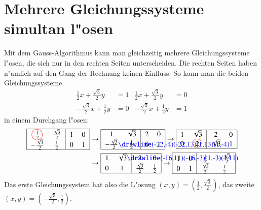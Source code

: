 \section{Mehrere Gleichungssysteme simultan l"osen\label{simultan}}
Mit dem Gauss-Algorithmus kann man gleichzeitig mehrere Gleichungssysteme
l"osen, die sich nur in den rechten Seiten unterscheiden. Die rechten
Seiten haben n"amlich auf den Gang der Rechnung keinen
Einfluss. So kann man die beiden Gleichungssysteme
\begin{align*}
\frac12x+\frac{\sqrt{3}}2y&=1
&
\frac12x+\frac{\sqrt{3}}2y&=0
\\
-\frac{\sqrt{3}}2x+\frac12y&=0
&
-\frac{\sqrt{3}}2x+\frac12y&=1
\end{align*}
in einem Durchgang l"osen:
\begin{align*}
\begin{tabular}{|>{$}c<{$}>{$}c<{$}|>{$}c<{$}>{$}c<{$}|}
\hline
\frac12%
\begin{picture}(0,0)
\color{red}\put(-3.5,3){\circle{15}}
\end{picture}%
&\frac{\sqrt{3}}2&1&0\\
-\frac{\sqrt{3}}2&\frac12&0&1\\
\hline
\end{tabular}
&\rightarrow
\begin{tabular}{|>{$}c<{$}>{$}c<{$}|>{$}c<{$}>{$}c<{$}|}
\hline
1&\sqrt{3}&2&0\\
-\frac{\sqrt{3}}2%
\begin{picture}(0,0)
\color{blue}\drawline(-22,-4)(-22,13)(1,13)(1,-4)
\end{picture}%
&\frac12&0&1\\
\hline
\end{tabular}
\rightarrow
\begin{tabular}{|>{$}c<{$}>{$}c<{$}|>{$}c<{$}>{$}c<{$}|}
\hline
1&\sqrt{3}&2&0\\
0&2%
\begin{picture}(0,0)
\color{red}\put(-3,4){\circle{12}}
\end{picture}%
&\sqrt{3}&1\\
\hline
\end{tabular}
\\
&\rightarrow
\begin{tabular}{|>{$}c<{$}>{$}c<{$}|>{$}c<{$}>{$}c<{$}|}
\hline
1&\sqrt{3}%
\begin{picture}(0,0)
\color{blue}\drawline(-16,11)(-16,-3)(1,-3)(1,11)
\end{picture}%
&2&0\\
0&1&\frac{\sqrt{3}}2&\frac12\\
\hline
\end{tabular}
\rightarrow
\begin{tabular}{|>{$}c<{$}>{$}c<{$}|>{$}c<{$}>{$}c<{$}|}
\hline
1&0&\frac12&-\frac{\sqrt{3}}2\\
0&1&\frac{\sqrt{3}}2&\frac12\\
\hline
\end{tabular}
\end{align*}
Das erste Gleichungssystem hat also die L"osung
$(x,y)=(\frac12,\frac{\sqrt{3}}2)$,
das zweite
$(x,y)=(-\frac{\sqrt{3}}2, \frac12)$.

